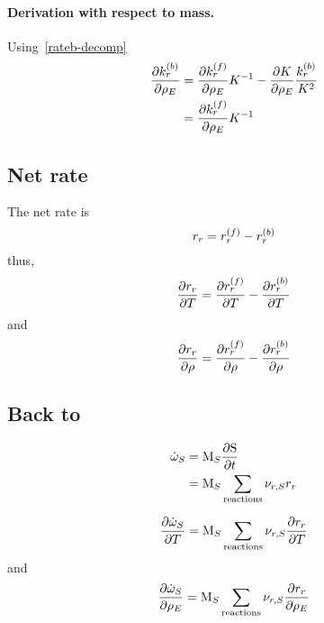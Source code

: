 \paragraph{Derivation with respect to mass.}
Using~\ref{rateb-decomp}
\begin{equation}
\begin{split}
\doverdm[E]{\bkwdratecons[r]} & = \doverdm[E]{\fwdratecons[r]}\Eqconst^{-1} - \doverdm[E]{\Eqconst}\frac{\bkwdratecons[r]}{\Eqconst^{2}} \\
                              & = \doverdm[E]{\fwdratecons[r]}\Eqconst^{-1}
\end{split}
\label{rateb-decomp-m}
\end{equation}

\subsection{Net rate}

The net rate is
\begin{equation}
\rate[r] = \fwdrate[r] - \bkwdrate[r]
\end{equation}
thus,
\begin{equation}
\doverdT{\rate[r]} = \doverdT{\fwdrate[r]} - \doverdT{\bkwdrate[r]}
\end{equation}
and
\begin{equation}
\doverdm{\rate[r]} = \doverdm{\fwdrate[r]} - \doverdm{\bkwdrate[r]}
\end{equation}

\subsection{Back to \texorpdfstring{\mdot}{omega dot}}
\begin{equation}
\begin{split}
\mdot[S] &= \Mm[S] \doverdt{\ce{S}} \\
         &= \Mm[S] \sum_{\text{reactions}}\scoef[r,S]\rate[r]
\end{split}
\end{equation}

\begin{equation}
\doverdT{\mdot[S]} = \Mm[S] \sum_{\text{reactions}}\scoef[r,S]\doverdT{\rate[r]}
\end{equation}
and
\begin{equation}
\doverdm[E]{\mdot[S]} = \Mm[S] \sum_{\text{reactions}}\scoef[r,S]\doverdm[E]{\rate[r]}
\end{equation}

